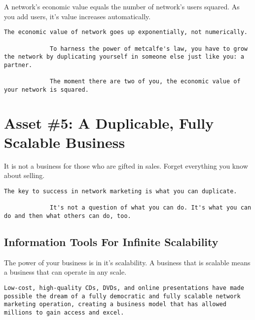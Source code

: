 \documentclass[a4paper, 12pt]{report}
\begin{document}
    \begin{note}
        A network's economic value equals the number of network's users squared. As you add users, it's value increases automatically. 
    \end{note}
    \begin{lstlisting}[style=latexFrameTB]
             The economic value of network goes up exponentially, not numerically.
              
             To harness the power of metcalfe's law, you have to grow the network by duplicating yourself in someone else just like you: a partner. 
              
             The moment there are two of you, the economic value of your network is squared.
    \end{lstlisting}
    
    \chapter{Asset \#5: A Duplicable, Fully Scalable Business}
    It is not a business for those who are gifted in sales. Forget everything you know about selling.
    
    \begin{lstlisting}[style=latexFrameTB]
             The key to success in network marketing is what you can duplicate.
             
             It's not a question of what you can do. It's what you can do and then what others can do, too.
    \end{lstlisting}
    \section{Information Tools For Infinite Scalability}
    The power of your business is in it's scalability. A business that is scalable means a business that can operate in any scale.
    
    \begin{lstlisting}[style=latexFrameTB]
             Low-cost, high-quality CDs, DVDs, and online presentations have made possible the dream of a fully democratic and fully scalable network marketing operation, creating a business model that has allowed millions to gain access and excel.
    \end{lstlisting}
    
\end{document}
